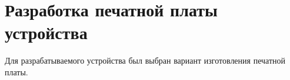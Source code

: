 \section{Разработка печатной платы устройства}
\label{sec:software}
Для разрабатываемого устройства был выбран вариант изготовления печатной платы.



